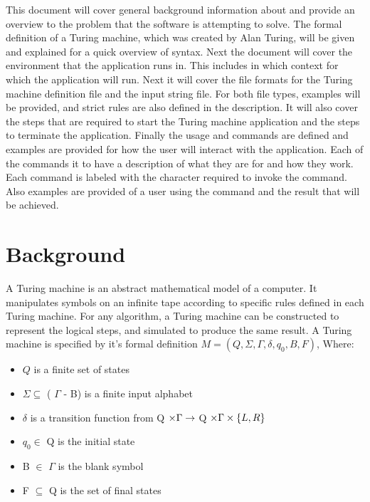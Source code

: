 \documentclass{report}
\begin{document}
    This document will cover general background information about and provide an overview to the problem that the software is attempting to solve. The formal definition of a Turing machine, which was created by Alan Turing, will be given and explained for a quick overview of syntax. Next the document will cover the environment that the application runs in. This includes in which context for which the application will run. Next it will cover the file formats for the Turing machine definition file and the input string file. For both file types, examples will be provided, and strict rules are also defined in the description. It will also cover the steps that are required to start the Turing machine application and the steps to terminate the application. Finally the usage and commands are defined and examples are provided for how the user will interact with the application. Each of the commands it to have a description of what they are for and how they work. Each command is labeled with the character required to invoke the command. Also examples are provided of a user using the command and the result that will be achieved. 
  
    
    

\chapter{Background}
 	A Turing machine is an abstract mathematical model of a computer. It manipulates symbols on an infinite tape according to specific rules defined in each Turing machine. For any algorithm, a Turing machine can be constructed to represent the logical steps, and simulated to produce the same result. A Turing machine is specified by it's formal definition $M = (Q, \Sigma, \Gamma,\delta,q_0 , B, F)$, Where:\newline
    
  
   
\begin{itemize}
\item $Q$ is a finite set of states
\item $\Sigma \subseteq $ ( $\Gamma$ - {B}) is a finite input alphabet
\item $\delta$ is a transition function from Q $\times \space \Gamma \rightarrow$ Q $\times \space \Gamma \times \left\{L, R\right\}$
\item $q_0 \in$ Q is the initial state
\item B $\in$ $\Gamma$  is the blank symbol
\item F $\subseteq$ Q is the set of final states
\end{itemize}
    
\end{document}
